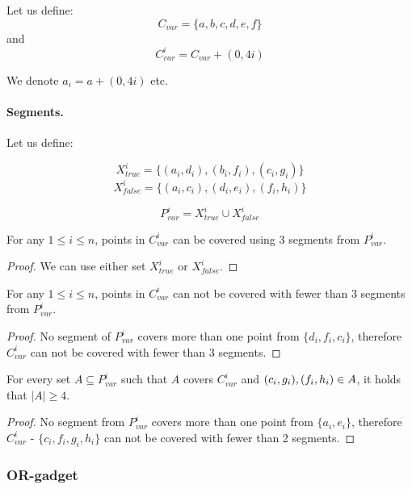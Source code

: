 Let us define: $$C_{var} =  \{a, b, c, d, e, f\}$$
and $$C_{var}^i = C_{var} + (0, 4i)$$

We denote $a_i = a + (0,4i)$ etc.

\paragraph{Segments.}

Let us define:

$$X_{true}^i =\{ (a_i, d_i), (b_i, f_i), (c_i, g_i)\}$$
$$X_{false}^i = \{(a_i, c_i), (d_i, e_i), (f_i, h_i)\}$$

$$P_{var}^i = X_{true}^i \cup X_{false}^i$$


\begin{lemma}
\label{choose_variables_solution}
For any $1 \le i \le n$, points in $C_{var}^i$
can be covered using 3 segments from $P_{var}^i$.
\end{lemma}

\begin{proof}
We can use either set $X_{true}^i$ or $X_{false}^i$.
\end{proof}

\begin{lemma}
\label{choose_variables_no_less}
For any $1 \le i \le n$, points in $C_{var}^i$
can not be covered with fewer than 3 segments from $P_{var}^i$.
\end{lemma}

\begin{proof}
No segment of $P_{var}^i$ covers more than one point from
$\{d_i, f_i, c_i\}$, therefore $C_{var}^i$ can
not be covered with fewer than 3 segments.
\end{proof}

\begin{lemma}
\label{choose_variables_both}
For every set $A \subseteq P_{var}^i$ such that $A$ covers $C_{var}^i$
and $(c_i, g_i), (f_i, h_i) \in A$,
it holds that $|A| \ge 4$.
\end{lemma}
\begin{proof}
No segment from $P_{var}^i$ covers more than one point from
$\{a_i, e_i\}$,
therefore 
$C_{var}^i$ - $\{c_i, f_i, g_i, h_i\}$
can not be covered with fewer than 2 segments.
\end{proof}


\subsubsection{OR-gadget}

